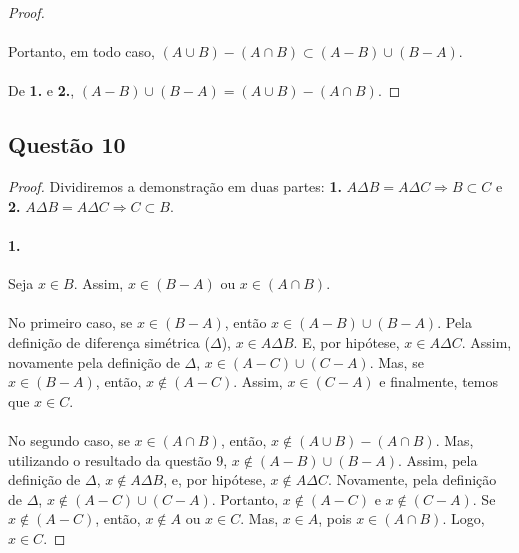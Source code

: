 \documentclass[9pt,twocolumn,a4paper]{article}
\begin{document}
\begin{proof}
    \paragraph{}
    Portanto, em todo caso, $(A \cup B) - (A \cap B) \subset (A - B) \cup (B - A)$.
    
    \paragraph{}
    De \textbf{1.} e \textbf{2.}, $(A - B) \cup (B - A) = (A \cup B) - (A \cap B)$.
    \end{proof}


    \subsection{Questão 10}
    \begin{proof}
    Dividiremos a demonstração em duas partes: \textbf{1.} $A \Delta B = A \Delta C \Rightarrow B \subset C$ e \textbf{2.} $A \Delta B = A\Delta C \Rightarrow C \subset B$.

    \paragraph{1.}
    Seja $x \in B$. Assim, $x \in (B - A)$ ou $x \in (A \cap B)$.

    \paragraph{}
    No primeiro caso, se $x \in (B - A)$, então $x \in (A - B) \cup (B - A)$. Pela definição de diferença simétrica ($\Delta$), $x \in A \Delta B$. E, por hipótese, $x \in A \Delta C$. Assim, novamente pela definição de $\Delta$, $x \in (A - C) \cup (C - A)$. Mas, se $x \in (B - A)$, então, $x \not\in (A - C)$. Assim, $x \in (C - A)$ e finalmente, temos que $x \in C$.

    \paragraph{}
    No segundo caso, se $x \in (A \cap B)$, então, $x \not\in (A \cup B) - (A \cap B)$. Mas, utilizando o resultado da questão 9, $x \not\in (A - B) \cup (B - A)$. Assim, pela definição de $\Delta$, $x \not\in A \Delta B$, e, por hipótese, $x \not\in A \Delta C$. Novamente, pela definição de $\Delta$, $x \not\in (A - C) \cup (C - A)$. Portanto, $x \not\in (A - C)$ e $x \not\in (C - A)$. Se $x \not\in (A - C)$, então, $x \not\in A$ ou $x \in C$. Mas, $x \in A$, pois $x \in (A \cap B)$. Logo, $x \in C$.


\end{proof}
\end{document}
